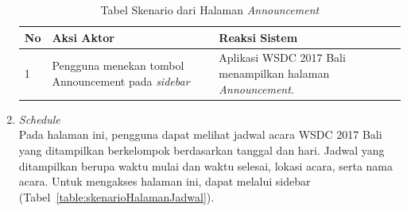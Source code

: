 \begin{enumerate}
		\begin{table}[H]
			\centering
			\begin{tabular}{|p{0.5cm}|p{7cm}|p{7cm}|}
				\hline
				No & Aksi Aktor                               & Reaksi Sistem                                          \\ \hline
				1  & Pengguna menekan tombol Announcement pada \textit{sidebar} & Aplikasi WSDC 2017 Bali menampilkan halaman \textit{Announcement}. \\ \hline
			\end{tabular}
			\caption{Tabel Skenario dari Halaman \textit{Announcement}}
			\label{table:skenarioHalamanPemberitahuan}
		\end{table}
	\item \textit{Schedule} \\ 
	Pada halaman ini, pengguna dapat melihat jadwal acara WSDC 2017 Bali yang ditampilkan berkelompok berdasarkan tanggal dan hari. Jadwal yang ditampilkan berupa waktu mulai dan waktu selesai, lokasi acara, serta nama acara. Untuk mengakses halaman ini, dapat melalui sidebar (Tabel~\ref{table:skenarioHalamanJadwal}).

\end{enumerate}
